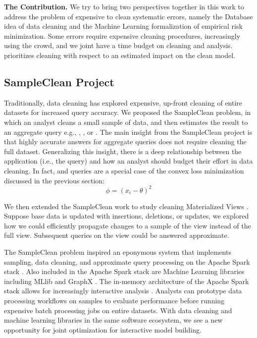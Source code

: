 \vspace{0.5em}

\noindent\textbf{The \sys Contribution. } We try to bring two perspectives together in this work to address the problem of expensive to clean systematic errors, namely the Database idea of data cleaning and the Machine Learning formalization of empirical risk minimization.
Some errors require expensive cleaning procedures, increasingly using the crowd, and we joint have a time budget on cleaning and analysis.
\sys prioritizes cleaning with respect to an estimated impact on the clean model.



\subsection{SampleClean Project}

Traditionally, data cleaning has explored expensive, up-front cleaning of entire datasets for increased query accuracy.
We proposed the SampleClean problem, in which an analyst cleans a small sample of data, and then estimates the result to an aggregate query e.g., \sumfunc, \countfunc, or \avgfunc.
The main insight from the SampleClean project is that highly accurate answers for aggregate queries does not require cleaning the full dataset.
Generalizing this insight, there is a deep relationship between the application (i.e., the query) and how an analyst should budget their effort in data cleaning.
In fact, \avgfunc and \sumfunc queries are a special case of the convex loss minimization discussed in the previous section:
\[
\phi = (x_{i} - \theta)^2
\]

We then extended the SampleClean work to study cleaning Materialized Views \cite{technicalReport}.
Suppose base data is updated with insertions, deletions, or updates, we explored how we could efficiently propagate
changes to a sample of the view instead of the full view.
Subsequent queries on the view could be answered approximate.

The SampleClean problem inspired an eponymous system that implements sampling, data cleaning, and approximate query processing on the Apache Spark stack \cite{sampleclean}.
Also included in the Apache Spark stack are Machine Learning libraries including MLlib \cite{mllib} and GraphX \cite{graphx}.
The in-memory architecture of the Apache Spark stack allows for increasingly interactive analysis \cite{AgarwalMPMMS13, armbrust2015spark}.
Analysts can prototype data processing workflows on samples to evaluate performance before running expensive batch processing jobs on entire datasets.
With data cleaning and machine learning libraries in the same software ecosystem, we see a new opportunity for joint optimization for interactive model building.



